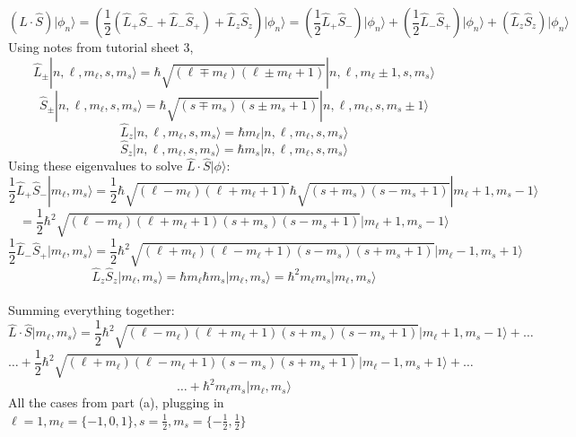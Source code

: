 \documentclass[11pt]{article}
\def\h{\hbar}
\def\l{\ell}
\def\ra{\rangle}
\renewcommand{\hat}{\widehat}
\theoremstyle{pink}
\theoremstyle{boxedsolution}
\theoremstyle{definition}
\theoremstyle{claim}
\begin{document}
\vspace{3mm}
\[\left(\hat{L}\cdot\hat{S}\right)|\phi_n\ra = \left(\frac{1}{2}\left(\hat{L}_+\hat{S}_-+\hat{L}_-\hat{S}_+\right)+\hat{L}_z\hat{S}_z\right)\Big|\phi_n\Big\ra = \left(\frac{1}{2}\hat{L}_+\hat{S}_-\right)\Big|\phi_n\Big\ra + \left(\frac{1}{2}\hat{L}_-\hat{S}_+\right)\Big|\phi_n\Big\ra + \left(\hat{L}_z\hat{S}_z\right)\Big|\phi_n\Big\ra\]
\newpage
Using notes from tutorial sheet 3,
\[\hat{L}_\pm|n,\l,m_\l,s,m_s\ra = \h\sqrt{(\l\mp m_\l)(\l\pm m_\l + 1)}|n,\l,m_\l\pm 1,s,m_s\ra\]
\vspace{3mm}
\[\hat{S}_\pm|n,\l,m_\l,s,m_s\ra = \h\sqrt{(s\mp m_s)(s\pm m_s + 1)}|n,\l,m_\l,s,m_s\pm1\ra\]
\vspace{3mm}
\[\hat{L}_z|n,\l,m_\l,s,m_s\ra = \h m_\l|n,\l,m_\l,s,m_s\ra\]
\vspace{3mm}
\[\hat{S}_z|n,\l,m_\l,s,m_s\ra = \h m_s|n,\l,m_\l,s,m_s\ra\]
\vspace{3mm}
Using these eigenvalues to solve $\hat{L}\cdot\hat{S}|\phi\ra$:
\[\frac{1}{2}\hat{L}_+\hat{S}_-|m_\l,m_s\rangle = \frac{1}{2}\hbar\sqrt{(\ell- m_\ell)(\ell+ m_\ell + 1)}\h\sqrt{(s+ m_s)(s- m_s + 1)}|m_\l+1,m_s-1\rangle\]
\vspace{3mm}
\[=\frac{1}{2}\h^2\sqrt{(\ell- m_\ell)(\ell+ m_\ell + 1)(s+ m_s)(s- m_s + 1)}\Big|m_\l+1,m_s-1\Big\rangle\]
\vspace{3mm}
\[\frac{1}{2}\hat{L}_-\hat{S}_+|m_\l,m_s\rangle = \frac{1}{2}\h^2\sqrt{(\ell+ m_\ell)(\ell- m_\ell + 1)(s- m_s)(s+ m_s + 1)}\Big|m_\l-1,m_s+1\Big\rangle\]
\vspace{3mm}
\[
\hat{L}_z\hat{S}_z|m_\l,m_s\ra = \h m_\l \h m_s|m_\l,m_s\ra = \h^2 m_\l m_s|m_\l,m_s\ra
\]
\vspace{3mm}
\\Summing everything together:
\[\hat{L}\cdot\hat{S}|m_\l,m_s\ra = \frac{1}{2}\h^2\sqrt{(\ell- m_\ell)(\ell+ m_\ell + 1)(s+ m_s)(s- m_s + 1)}\Big|m_\l+1,m_s-1\Big\rangle + \dots \]
\vspace{3mm}
\[\dots + \frac{1}{2}\h^2\sqrt{(\ell+ m_\ell)(\ell- m_\ell + 1)(s- m_s)(s+ m_s + 1)}\Big|m_\l-1,m_s+1\Big\rangle + \dots\]
\vspace{3mm}
\[
\dots + \h^2 m_\l m_s|m_\l,m_s\ra
\]
\newpage
All the cases from part (a), plugging in $\l = 1 , m_\l = \{-1,0,1\}, s=\frac{1}{2}, m_s=\{-\frac{1}{2},\frac{1}{2}\}$
\end{document}

